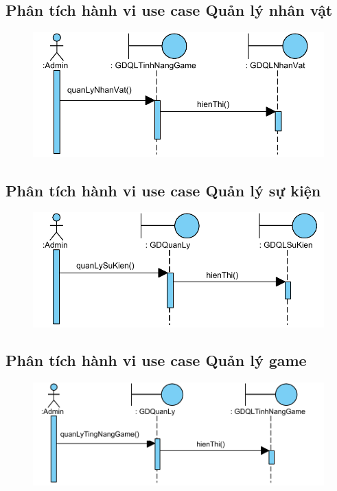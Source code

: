 \documentclass[3p]{elsarticle}
\begin{document}
\subsection{Phân tích hành vi use case Quản lý nhân vật}
\begin{figure}[!htbp]
	\hspace*{-.5in}
	\centering
	\includegraphics[scale=.55]{images/sequence-pdfs/admin/manageCharacter.pdf}
\end{figure}
\newpage

\subsection{Phân tích hành vi use case Quản lý sự kiện}
\begin{figure}[!htbp]
	\hspace*{-.5in}
	\centering
	\includegraphics[scale=.55]{images/sequence-pdfs/admin/manageEvent.pdf}
\end{figure}
\newpage

\subsection{Phân tích hành vi use case Quản lý game}
\begin{figure}[!htbp]
	\hspace*{-.5in}
	\centering
	\includegraphics[scale=.55]{images/sequence-pdfs/admin/manageGame.pdf}
\end{figure}
\newpage
\end{document}
